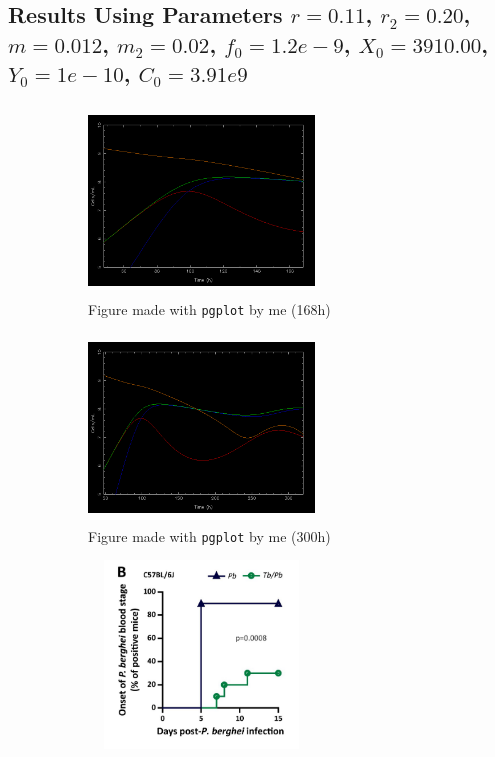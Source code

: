 \documentclass[11pt]{article}
\begin{document}
	\subsection{Results Using Parameters $r = 0.11$, $r_2 = 0.20$, $m = 0.012$, $m_2 = 0.02$, $f_0 = 1.2e-9$, $X_0 = 3910.00$, $Y_0= 1e-10$, $C_0= 3.91e9$}
	
	\begin{figure}[!htb]
		\begin{center}
		\begin{subfigure}{8cm}
			\centering\includegraphics[width=6cm, height=5cm]{plot6.png}
			\caption{Figure made with \texttt{pgplot} by me (168h)}
		\end{subfigure}
		\begin{subfigure}{8cm}
			\centering\includegraphics[width=6cm, height=5cm]{plot5.png}
			\caption{Figure made with \texttt{pgplot} by me (300h)}
		\end{subfigure}
			\begin{subfigure}{8cm}
				\centering\includegraphics[width=6cm, height=5cm]{plot7.png}

\end{subfigure}
\end{center}
\end{figure}
\end{document}
